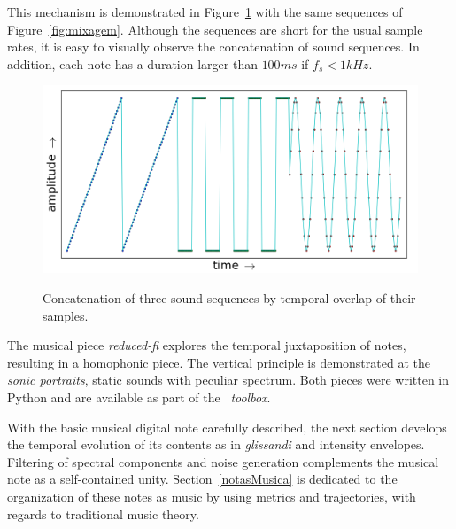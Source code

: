 This mechanism is demonstrated in Figure~\ref{fig:concatenacao} with the same sequences of Figure~\ref{fig:mixagem}. Although the sequences are short for the usual sample rates, it is easy to visually observe the concatenation of sound sequences. In addition, each note has  a duration larger than $100ms$ if $f_s<1kHz$.

\begin{figure}[h!]
{    \centering
        \includegraphics[width=.5\columnwidth]{figures/concatenacao__}}
    \caption{Concatenation of three sound sequences by temporal overlap of their samples.}
        \label{fig:concatenacao}
\end{figure}

The musical piece \emph{reduced-fi} explores the temporal juxtaposition of notes, resulting in a homophonic piece. The vertical principle is demonstrated at the \emph{sonic portraits}, static sounds with peculiar spectrum. Both pieces were written in Python and are available as part of the \massa\ \emph{toolbox}.\cite{MASSA}

With the basic musical digital note carefully described, the next section develops the temporal evolution of its contents as in \emph{glissandi} and intensity envelopes. Filtering of spectral components and noise generation complements the musical note as a self-contained unity. Section~\ref{notasMusica} is dedicated to the organization of these notes as music by using metrics and trajectories, with regards to traditional music theory.



